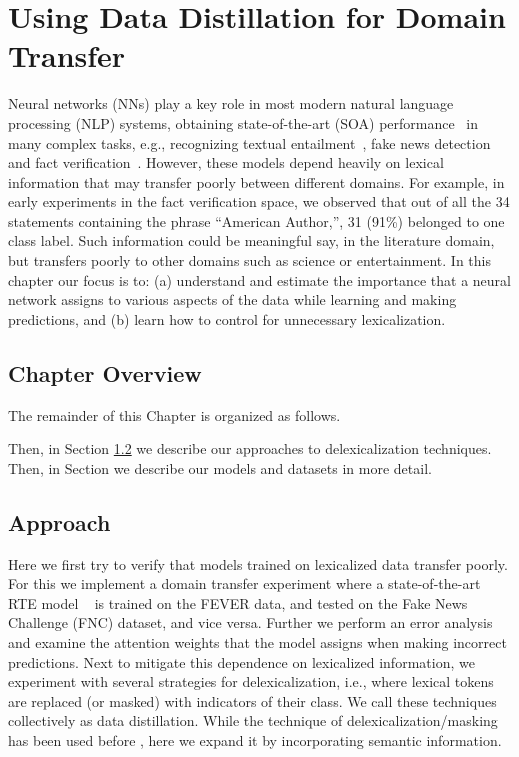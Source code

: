 \chapter{Using Data Distillation for Domain Transfer\label{chapter:emnlp2016}}



Neural networks (NNs)  play a key role in most modern natural language processing (NLP) systems, obtaining state-of-the-art (SOA) performance~\citep{devlin2018bert, sun2018improving,bohnet2018morphosyntactic} in many complex tasks, e.g., recognizing textual entailment~\citep{kim2018semantic}, fake news detection~\citep{baird2017talos} and fact verification~\citep{nie2018combining}. However, these models depend heavily on lexical information that may transfer poorly between different domains. For example, in early experiments in the fact verification space, we observed that out of all the 34 statements containing the phrase ``American Author,'', 31 (91\%) belonged to one class label. Such information could be meaningful say, in the literature domain, but transfers poorly to other domains such as science or entertainment. In this chapter our focus is to: (a) understand and estimate the importance that a neural network assigns to various aspects of the data while learning and making predictions, and (b) learn how to control for unnecessary lexicalization. 


\section{Chapter Overview}
The remainder of this Chapter is organized as follows.

Then, in Section  \ref{sec-emnlp2019:approach} we describe our approaches to delexicalization techniques. Then, in Section \label{sec-emnlp2019:models}  we describe our models and datasets  in more detail.


\section{Approach}
\label{sec-emnlp2019:approach}

Here we first try to verify that models trained on lexicalized data transfer poorly. For this we implement a domain transfer experiment where a state-of-the-art RTE model ~\citep{parikh2016decomposable}  is trained on the FEVER data, and tested on the Fake News Challenge (FNC) \citep{pomerleau2017fake}
dataset, and vice versa. Further we perform an error analysis and examine the attention weights that the model  assigns when making incorrect predictions. Next to mitigate this dependence on lexicalized information, we experiment with several strategies for delexicalization, i.e., where lexical tokens are replaced (or masked) with indicators of their class. We call these techniques collectively as data distillation. While the technique of delexicalization/masking has been used before \citep[e.g.,]{zeman2008cross}, here we expand it by incorporating semantic information.




